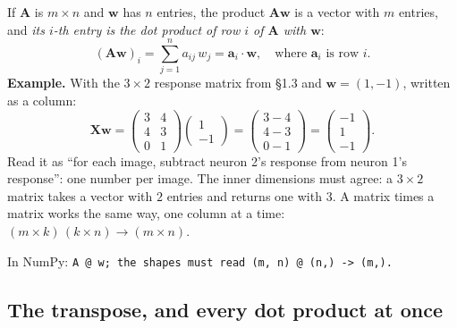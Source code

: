 \documentclass[11pt]{article}
\newcommand{\vw}{\bm{w}}
\newcommand{\mX}{\bm{X}}
\newcommand{\np}[1]{{\small\color{lightgray}In NumPy: \texttt{#1}}\par}
\begin{document}
If $\bm{A}$ is $m \times n$ and $\vw$ has $n$ entries, the product $\bm{A}\vw$ is a vector
with $m$ entries, and \emph{its $i$-th entry is the dot product of row $i$ of $\bm{A}$ with
$\vw$}:
\[
(\bm{A}\vw)_i = \sum_{j=1}^{n} a_{ij}\,w_j = \bm{a}_i \cdot \vw ,
\quad\text{where } \bm{a}_i \text{ is row } i .
\]
\textbf{Example.} With the $3 \times 2$ response matrix from \S1.3 and $\vw = (1, -1)$,
written as a column:
\[
\mX\vw = \begin{pmatrix} 3 & 4 \\ 4 & 3 \\ 0 & 1 \end{pmatrix}
\begin{pmatrix} 1 \\ -1 \end{pmatrix}
= \begin{pmatrix} 3 - 4 \\ 4 - 3 \\ 0 - 1 \end{pmatrix}
= \begin{pmatrix} -1 \\ 1 \\ -1 \end{pmatrix} .
\]
Read it as ``for each image, subtract neuron 2's response from neuron 1's response'': one
number per image. The inner dimensions must agree: a $3 \times 2$ matrix takes a vector
with $2$ entries and returns one with $3$. A matrix times a matrix works the same way, one
column at a time: $(m \times k)\,(k \times n) \to (m \times n)$.

\np{A @ w; the shapes must read (m, n) @ (n,) -> (m,).}

\subsection{The transpose, and every dot product at once}
\end{document}
